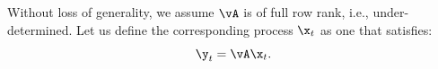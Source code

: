 \documentclass[../../book-main.tex]{subfiles}
\begin{document}


Without loss of generality, we assume $\vA$ is of full row rank, i.e., under-determined. Let us define the corresponding process $\x_t$ as one that satisfies:
\begin{equation}
\y_t = \vA \x_t.   
\end{equation}
\end{document}
